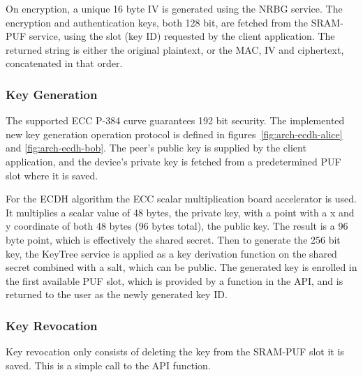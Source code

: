 On encryption, a unique 16 byte \ac{IV} is generated using the \ac{NRBG} service.
The encryption and authentication keys, both 128 bit, are fetched from the SRAM-PUF service, using the slot (key ID) requested by the client application.
The returned string is either the original plaintext, or the \ac{MAC}, \ac{IV} and ciphertext, concatenated in that order.




\subsubsection*{Key Generation}
The supported \ac{ECC} P-384 curve guarantees 192 bit security.
The implemented new key generation operation protocol is defined in figures~\ref{fig:arch-ecdh-alice} and \ref{fig:arch-ecdh-bob}.
The peer's public key is supplied by the client application, and the device's private key is fetched from a predetermined PUF slot where it is saved.

For the ECDH algorithm the ECC scalar multiplication board accelerator is used. It multiplies a scalar value of 48 bytes, the private key, with a point with a x and y coordinate of both 48 bytes (96 bytes total), the public key.
The result is a 96 byte point, which is effectively the shared secret.
Then to generate the 256 bit key, the KeyTree service is applied as a key derivation function on the shared secret combined with a salt, which can be public.
The generated key is enrolled in the first available PUF slot, which is provided by a function in the API, and is returned to the user as the newly generated key ID.

\subsubsection*{Key Revocation}
Key revocation only consists of deleting the key from the SRAM-PUF slot it is saved. This is a simple call to the API function.

